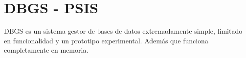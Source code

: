 \chapter{DBGS -\/ PSIS}
\hypertarget{index}{}\label{index}
DBGS es un sistema gestor de bases de datos extremadamente simple, limitado en funcionalidad y un prototipo experimental. Además que funciona completamente en memoria. 
